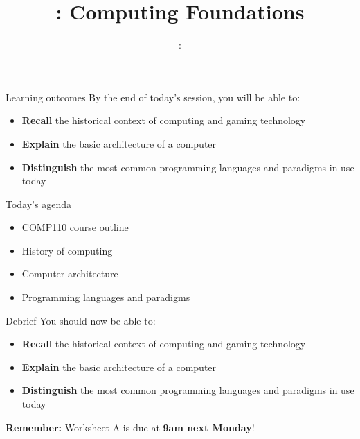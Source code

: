 \usepackage{../../beamerthemeFalmouthGamesAcademy}
\usepackage{multimedia}
\graphicspath{ {../../} }


\usepackage[normalem]{ulem}
\usepackage{wasysym}

\usepackage{pdfpages}

\usetikzlibrary{arrows,automata}




\title{\sessionnumber: Computing Foundations}
\subtitle{\modulecode: \moduletitle}

\frame{\titlepage} 

\begin{frame}{Learning outcomes}
	By the end of today's session, you will be able to:
	\begin{itemize}
		\item \textbf{Recall} the historical context of computing and gaming technology
		\item \textbf{Explain} the basic architecture of a computer
		\item \textbf{Distinguish} the most common programming languages and paradigms in use today
	\end{itemize}
\end{frame}

\begin{frame}{Today's agenda}
	\begin{itemize}
		\item COMP110 course outline
		\item History of computing
		\item Computer architecture
		\item Programming languages and paradigms
	\end{itemize}
\end{frame}









\begin{frame}{Debrief}
	\pause You should now be able to:
	\begin{itemize}
		\item \textbf{Recall} the historical context of computing and gaming technology
		\item \textbf{Explain} the basic architecture of a computer
		\item \textbf{Distinguish} the most common programming languages and paradigms in use today
	\end{itemize}
	\pause \textbf{Remember:} Worksheet A is due at \textbf{9am next Monday}!
\end{frame}


